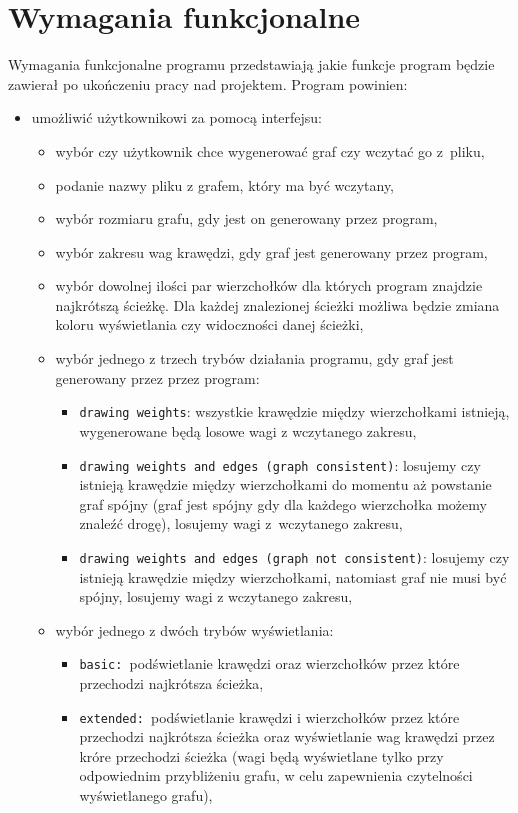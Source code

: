 \documentclass[12pt, a4paper]{article}
\begin{document}
\section{Wymagania funkcjonalne}
Wymagania funkcjonalne programu przedstawiają jakie funkcje program będzie zawierał po ukończeniu pracy nad projektem.
Program powinien:
\begin{itemize}
\item umożliwić użytkownikowi za pomocą interfejsu:
    \begin{itemize}
        \item wybór czy użytkownik chce wygenerować graf czy wczytać go z~pliku,
        \item podanie nazwy pliku z grafem, który ma być wczytany,
        \item wybór rozmiaru grafu, gdy jest on generowany przez program,
        \item wybór zakresu wag krawędzi, gdy graf jest generowany przez program,
        \item wybór dowolnej ilości par wierzchołków dla których program znajdzie najkrótszą ścieżkę. Dla każdej znalezionej ścieżki możliwa będzie zmiana koloru wyświetlania czy widoczności danej ścieżki,
        \item wybór jednego z trzech trybów działania programu, gdy graf jest generowany przez przez program:
        \begin{itemize}
            \item \texttt{drawing weights}: wszystkie krawędzie między wierzchołkami istnieją, wygenerowane będą losowe wagi z wczytanego zakresu,
        	\item \texttt{drawing weights and edges (graph consistent)}: losujemy czy istnieją krawędzie między wierzchołkami do momentu aż powstanie graf spójny (graf jest spójny gdy dla każdego wierzchołka możemy znaleźć drogę), losujemy wagi z~wczytanego zakresu,
        	\item \texttt{drawing weights and edges (graph not consistent)}: losujemy czy istnieją krawędzie między wierzchołkami, natomiast graf nie musi być spójny, losujemy wagi z wczytanego zakresu,
        \end{itemize}
        \item wybór jednego z dwóch trybów wyświetlania:
        \begin{itemize}
            \item \texttt{basic: }podświetlanie krawędzi oraz wierzchołków przez które przechodzi najkrótsza ścieżka,
            \item \texttt{extended: }podświetlanie krawędzi i wierzchołków przez które przechodzi najkrótsza ścieżka oraz wyświetlanie wag krawędzi przez króre przechodzi ścieżka (wagi będą wyświetlane tylko przy odpowiednim przybliżeniu grafu, w celu zapewnienia czytelności wyświetlanego grafu),

\end{itemize}
\end{itemize}
\end{itemize}
\end{document}
